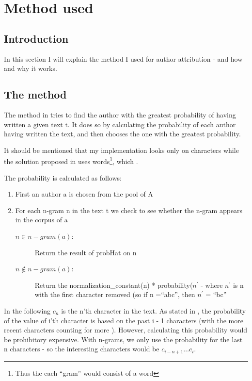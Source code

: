 \section{Method used}
\label{method}

\subsection{Introduction}
In this section I will explain the method I used for author attribution - and how and why it works.

\subsection{The method}
The method in \cite{4} tries to find the author with the greatest probability of having written a given text t. It does so by calculating the probability of each author having written the text, and then chooses the one with the greatest probability.

It should be mentioned that my implementation looks only on characters while the solution proposed in \cite{nr4} uses words\footnote{Thus the each ``gram'' would consist of a word}, which   .

The probability is calculated as follows:
\begin{enumerate} 
\item First an author a is chosen from the pool of A 
\item For each n-gram n in the text t we check to see whether the n-gram appears in the corpus of a
\begin{description}
\item[$n \in n-gram(a)$:] Return the result of probHat on n
\item[$n \notin n-gram(a)$:] Return the normalization\_constant(n) * probability($n^\prime$ - where $n^{\prime}$ is n with the first character removed (so if n =``abc'', then $n^{\prime}$ = ``bc'' 
\end{description} 
\end{enumerate}

In the following $c_n$ is the n'th character in the text. As stated in \cite{nr4}, the probability of the value of i'th character is based on the past i - 1 characters (with the more recent characters counting for more ). However, calculating this probability would be prohibitory expensive. With n-grams, we only use the probability for the last n characters - so the interesting characters would be $c_{i - n + 1} \ldots c_{i}$.

